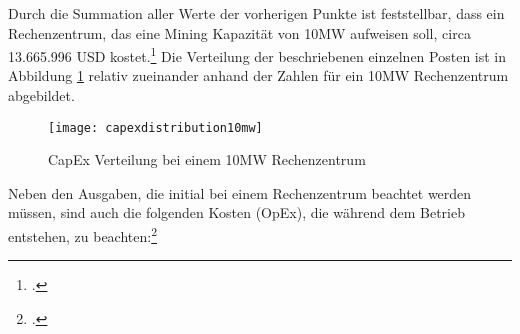 Durch die Summation aller Werte der vorherigen Punkte ist feststellbar, dass ein Rechenzentrum, das eine Mining Kapazität
von 10MW aufweisen soll, circa 13.665.996 USD kostet.\footcite[Vgl.][]{appendix:summaryofinvestment} Die Verteilung der
beschriebenen einzelnen Posten ist in Abbildung \ref{figure:capexdistribution10mw} relativ zueinander anhand der Zahlen für
ein 10MW Rechenzentrum abgebildet.

\begin{figure}[H]
    \caption{CapEx Verteilung bei einem 10MW Rechenzentrum}
    \texttt{[image: capexdistribution10mw]}
    \label{figure:capexdistribution10mw}
\end{figure}

Neben den Ausgaben, die initial bei einem Rechenzentrum beachtet werden müssen, sind auch die folgenden Kosten (\ac{OpEx}),
die während dem Betrieb entstehen, zu beachten:\footcite[Vgl.][]{appendix:opex}
